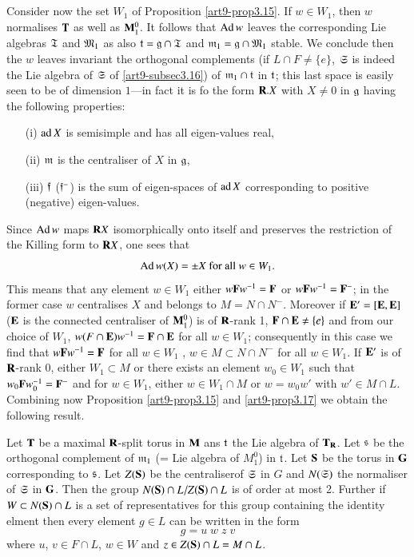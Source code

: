 \subsection{}\label{ref-subsec3.18}
Consider now the set $W_1$ of Proposition \ref{art9-prop3.15}. If $w \in W_1$, then $w$ normalises $\mathbf{T}$ as well as $\mathbf{M}^0_1$. It follows that $\operatorname{Ad} w$ leaves the corresponding Lie algebras $\mathfrak{T}$ and $\mathfrak{M}_1$ as also $\mathfrak{t} =\mathfrak{g} \cap \mathfrak{T}$ and $\mathfrak{m}_1 = \mathfrak{g} \cap \mathfrak{M}_1$ stable. We conclude then the $w$ leaves invariant the orthogonal complements (if $L \cap  F \neq \{e\}$, $\mathfrak{S}$ is indeed the Lie algebra of $\mathfrak{S}$ of  \ref{art9-subsec3.16}) of $\mathfrak{m}_1 \cap \mathfrak{t}$  in $\mathfrak{t}$; this last space is easily seen to be of dimension $1$---in  fact it is fo the  form $\mathbf{R}.X$ with $X \neq 0$ in $\mathfrak{g}$ having the following properties:
\begin{itemize}
\item[(i)] $\operatorname{ad} X$ is semisimple and has all eigen-values real,

\item[(ii)] $\mathfrak{m}$ is the centraliser of $X$ in $\mathfrak{g}$,

\item[(iii)] $\mathfrak{f}$ (\resp $\mathfrak{f}^-$) is the sum of eigen-spaces of $\operatorname{ad} X$ corresponding to positive (\resp negative) eigen-values.
\end{itemize}
Since $\operatorname{Ad} w$ maps $\mathbf{R} X$ isomorphically onto itself and preserves the restriction of the Killing form to $\mathbf{R} X$, one sees that 
$$
\operatorname{Ad} w (X) = \pm X \text{ for all } w \in W_1.
$$
This means that any element $w \in W_1$ either $w \mathbf{F} w^{-1} = \mathbf{F}$ or $w \mathbf{F} w^{-1} = \mathbf{F}^-$; in the former case $w$ centralises $X$ and belongs to $M = N \cap N^-$. Moreover if $\mathbf{E}' = [\mathbf{E},\mathbf{E}]$ ($\mathbf{E}$ is the connected centraliser of $\mathbf{M}^0_1$) is of $\mathbf{R}$-rank 1, $\mathbf{F} \cap \mathbf{E} \neq \{e\}$ and from our choice of $W_1$, $w (F \cap \mathbf{E}) w^{-1} = \mathbf{F} \cap \mathbf{E}$ for all $w \in W_1$; consequently in this case we find that $w \mathbf{F} w^{-1} = \mathbf{F}$ for all $w \in W_1$ \ie, $w \in M \subset N \cap N^-$ for all $w \in W_1$. If $\mathbf{E}'$ is of $\mathbf{R}$-rank 0, either $W_1 \subset M$ or there exists an element $w_0 \in W_1$ such that $w_0 \mathbf{F} w_0^{-1}=\mathbf{F}^-$ and for $w \in W_1$, either $w \in W_1 \cap M$ or $w = w_0 w'$ with $w' \in M \cap L$. Combining now Proposition \ref{art9-prop3.15}  and \ref{art9-prop3.17} we obtain the following result.

\setcounter{definition}{18}
\begin{proposition}\label{art9-prop3.19}
Let $\mathbf{T}$ be a maximal $\mathbf{R}$-split torus in $\mathbf{M}$ ans $\mathfrak{t}$ the Lie algebra of $\mathbf{T}_{\mathbf{R}}$. Let $\mathfrak{s}$ be the orthogonal complement of $\mathfrak{m}_1$ (= Lie algebra of $M^0_1$) in $\mathfrak{t}$. Let $\mathbf{S}$ be the torus in $\mathbf{G}$ corresponding to $\mathfrak{s}$. Let $Z (\mathbf{S})$ be the centraliser\pageoriginale  of $\mathfrak{S}$ in $G$ and $N(\mathfrak{S})$ the normaliser of $\mathfrak{S}$ in $\mathbf{G}$. Then the group $N (\mathbf{S}) \cap L / Z(\mathbf{S}) \cap L$ is of order at most 2. Further if $W \subset N (\mathbf{S}) \cap L$ is a set of representatives for this group containing the identity elment then every element $g \in L$ can be written in the form 
$$
g = u \;w \;z \;v
$$
where $u$, $v \in F \cap L$, $w \in W$ and $z \in Z (\mathbf{S}) \cap L = M \cap L$.
\end{proposition} 

